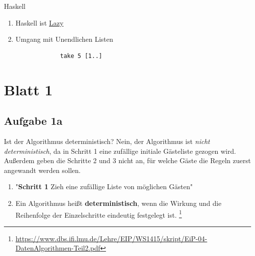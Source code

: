 \documentclass[
	aspectratio=169, 
	10pt 
]{beamer}
\begin{document}
\begin{frame}[t,fragile]{Haskell}
	\begin{enumerate}[$\rightarrow$]
		\item Haskell ist  \underline{Lazy}
		\item Umgang mit Unendlichen Listen
	\end{enumerate}
	
	\mbox{}\newline
	\mbox{}\newline

	\begin{center}
		\begin{minipage}{0.2\textwidth}
			\begin{verbatim}
				take 5 [1..]
			\end{verbatim}
		\end{minipage}
		\end{center}


\end{frame}

\section{Blatt 1}
\subsection{Aufgabe 1a}
\begin{frame}{\insertsubsection} 
	\begin{exercise}{Ist der Algorithmus deterministisch?}
	Nein, der Algorithmus ist \textit{nicht deterministisch}, da in Schritt 1 eine zufällige
	initiale Gästeliste gezogen wird. Außerdem geben die Schritte 2 und 3 nicht an,
	für welche Gäste die Regeln zuerst angewandt werden sollen.
	\end{exercise}

	\mbox{}

	\begin{enumerate}[$\rightarrow$]
		\item "\textbf{Schritt 1} Zieh eine zufällige Liste von möglichen Gästen"
		\item Ein Algorithmus heißt \textbf{deterministisch}, wenn die Wirkung und die Reihenfolge der Einzelschritte eindeutig festgelegt ist. \footnote[1]{\url{https://www.dbs.ifi.lmu.de/Lehre/EIP/WS1415/skript/EiP-04-DatenAlgorithmen-Teil2.pdf}}
	\end{enumerate}  
\end{frame}
\end{document}

